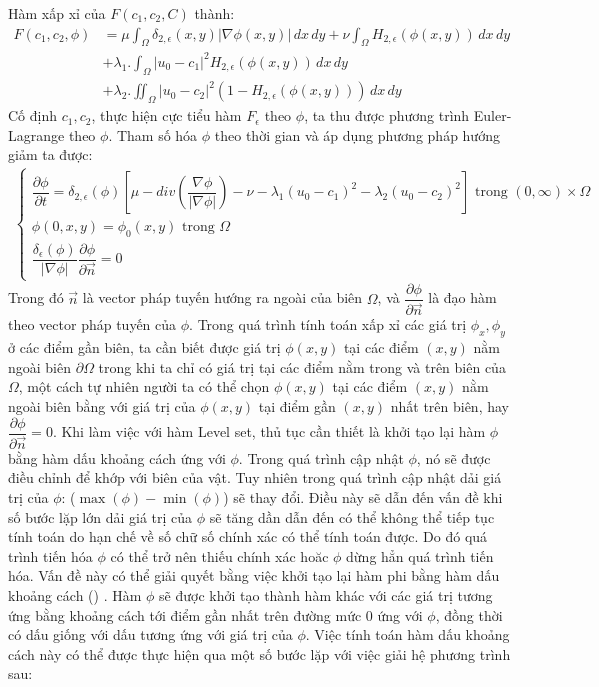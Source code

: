\documentclass[12pt, oneside, a4paper]{book}
\begin{document}
 Hàm xấp xỉ của $F(c_1,c_2,C)$ thành:
\begin{equation*}
\begin{split}
F(c_1, c_2, \phi)&=\mu \int_{\Omega}\delta_{2,\epsilon}(x,y)|\nabla \phi(x,y)|\,dx\,dy+\nu  \int_{\Omega}H_{2,\epsilon}( \phi(x,y))\,dx\,dy \\ 
&+\lambda_1 .\int_{\Omega} |u_0-c_1|^2H_{2,\epsilon}(\phi(x,y)) \,dx\,dy\\&+\lambda_2 .\iint_{\Omega} |u_0-c_2|^2(1-H_{2,\epsilon}(\phi(x,y))) \,dx\,dy
\end{split}
\end{equation*}
Cố định $c_1, c_2$, thực hiện cực tiểu hàm $F_{\epsilon}$ theo $\phi$, ta thu được phương trình Euler-Lagrange theo $\phi$. Tham số hóa $\phi$ theo thời gian và áp dụng phương pháp hướng giảm ta được:
\begin{align}
\begin{cases}
\dfrac{\partial \phi}{\partial t}= \delta_{2,\epsilon}(\phi)[\mu- div(\dfrac{\nabla \phi}{|\nabla \phi|})- \nu- \lambda_1 (u_0-c_1)^2-\lambda_2 (u_0-c_2)^2]  \text{ trong } (0,\infty)\times \Omega\\
\phi(0,x,y)=\phi_0(x,y) \text{ trong } \Omega \\
\dfrac{\delta_{\epsilon}(\phi)}{|\nabla \phi|}\dfrac{\partial \phi}{\partial \vec{n}}=0
\end{cases}
\end{align}
Trong đó $\vec{n}$ là vector pháp tuyến hướng ra ngoài của biên $\Omega$, và $\dfrac{\partial \phi}{\partial \vec{n}} $ là đạo hàm theo vector pháp tuyến của $\phi$. Trong quá trình tính toán xấp xỉ các giá trị $\phi_x, \phi_y$ ở các điểm gần biên, ta cần biết được giá trị $\phi(x,y)$ tại các điểm $(x, y)$ nằm ngoài biên $\partial \Omega$ trong khi ta chỉ có giá trị tại các điểm nằm trong và trên biên của $\Omega$, một cách tự nhiên người ta có thể chọn $\phi(x,y)$ tại các điểm $(x, y)$ nằm ngoài biên bằng với giá trị của $\phi(x,y)$ tại điểm gần $(x,y)$  nhất trên biên, hay $\dfrac{\partial \phi}{\partial \vec{n}}=0$. Khi làm việc với hàm Level set, thủ tục cần thiết là khởi tạo lại hàm $\phi$ bằng hàm dấu khoảng cách ứng với $\phi$. Trong quá trình cập nhật $\phi$, nó sẽ được điều chỉnh để khớp với biên của vật. Tuy nhiên trong quá trình cập nhật dải giá trị của $\phi$: ($\max(\phi)-\min(\phi)$) sẽ thay đổi. Điều này sẽ dẫn đến vấn đề  khi số bước lặp lớn dải giá trị của $\phi$ sẽ tăng dần  dẫn đến có thể không thể tiếp tục tính toán do hạn chế về số chữ số chính xác có thể tính toán được. Do đó quá trình tiến hóa $\phi$ có thể trở nên thiếu chính xác hoăc $\phi$ dừng hẳn quá trình tiến hóa. Vấn đề này có thể giải quyết bằng việc khởi tạo lại hàm phi bằng hàm dấu khoảng cách () . Hàm $\phi$ sẽ được khởi tạo thành hàm khác với các giá trị tương ứng bằng khoảng cách tới điểm gần nhất trên đường mức 0 ứng với $\phi$, đồng thời có dấu giống với dấu tương ứng với giá trị của $\phi$. Việc tính toán hàm dấu khoảng cách này có thể được thực hiện qua một số bước lặp với việc giải hệ phương trình sau:
\end{document}
